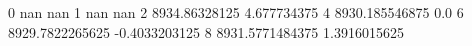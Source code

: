 0 nan nan
1 nan nan
2 8934.86328125 4.677734375
4 8930.185546875 0.0
6 8929.7822265625 -0.4033203125
8 8931.5771484375 1.3916015625
